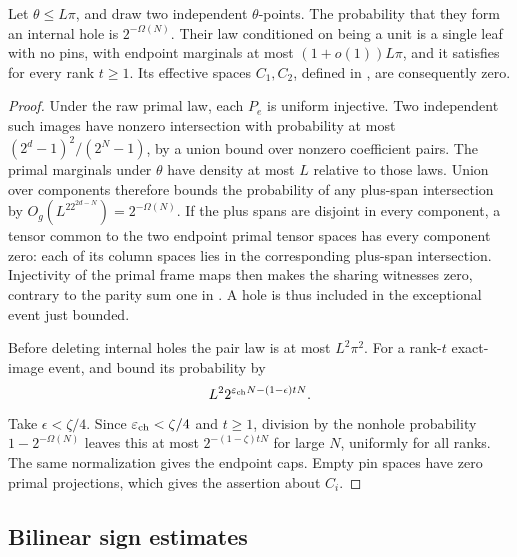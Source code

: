\begin{corollary}
\label{cor:independent-point-leaf}
Let \(\theta\le L\pi\), and draw two independent \(\theta\)-points.
The probability that they form an internal hole is \(2^{-\Omega(N)}\).
Their law conditioned on being a unit is a single leaf with no pins,
with endpoint marginals at most \((1+o(1))L\pi\), and it satisfies
 for every rank \(t\ge1\).  Its effective spaces
\(C_1,C_2\), defined in , are consequently zero.
\end{corollary}
\begin{proof}
Under the raw primal law, each \(P_e\) is uniform injective.  Two
independent such images have nonzero intersection with probability at
most \((2^d-1)^2/(2^N-1)\), by a union bound over nonzero coefficient
pairs.  The primal marginals under \(\theta\) have density at most \(L\)
relative to those laws.  Union over components therefore bounds the
probability of any plus-span intersection by
\(O_g(L^22^{2d-N})=2^{-\Omega(N)}\).
If the plus spans are disjoint in every component, a tensor common to
the two endpoint primal tensor spaces has every component zero: each
of its column spaces lies in the corresponding plus-span intersection.
Injectivity of the primal frame maps then makes the sharing witnesses
zero, contrary to the parity sum one in
.  A hole is thus included in the exceptional
event just bounded.

Before deleting internal holes the pair law is at most \(L^2\pi^2\).
For a rank-\(t\) exact-image event,  and
 bound its probability by
\[
 L^2 2^{\varepsilon_{\rm ch}N-(1-\epsilon)tN}.
\]
Take \(\epsilon<\zeta/4\).  Since
\(\varepsilon_{\rm ch}<\zeta/4\) and \(t\ge1\), division by the
nonhole probability \(1-2^{-\Omega(N)}\) leaves this at most
\(2^{-(1-\zeta)tN}\) for large \(N\), uniformly for all ranks.
The same normalization gives the endpoint caps.  Empty pin spaces have
zero primal projections, which gives the assertion about \(C_i\).
\end{proof}

\subsection{Bilinear sign estimates}

